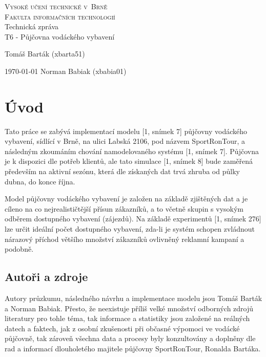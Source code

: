 \documentclass[a4paper, 12pt, hidelinks]{article}
\begin{document}
\begin{titlepage}
	\begin{center}
		\textsc{
			\Huge{Vysoké učení technické v~Brně}\\
			\huge{Fakulta informačních technologií\\}
		}
		\LARGE{
			Technická zpráva\\
			\Huge{T6 - Půjčovna vodáckého vybavení}\\
		}
	\end{center}
	{\Large{
		\hfill
		Tomáš Barták (xbarta51)

        \today
        \hfill
        Norman Babiak (xbabia01)

		}
	}
\end{titlepage}

\rhead{}
\newpage
\tableofcontents
\newpage
\section{Úvod}
Tato práce se zabývá implementací modelu [1, snímek 7] půjčovny vodáckého vybavení, sídlící v Brně, na ulici Labská 2106, pod názvem SportRonTour, a následným zkoumáním chování namodelovaného systému [1, snímek 7]. Půjčovna je k dispozici dle potřeb klientů, ale tato simulace [1, snímek 8] bude zaměřená především na aktivní sezónu, která dle získaných dat trvá zhruba od půlky dubna, do konce října. 

Model půjčovny vodáckého vybavení je založen na základě zjištěných dat a je cíleno na co nejrealističtější přísun zákazníků, a to včetně skupin s vysokým odběrem dostupného vybavení (zájezdů). Na základě experimentů [1, snímek 276] lze určit ideální počet dostupného vybavení, zda-li je systém schopen zvládnout nárazový příchod většího množství zákazníků ovlivněný reklamní kampaní a podobně.

\subsection{Autoři a zdroje}
Autory průzkumu, následného návrhu a implementace modelu jsou Tomáš Barták a Norman Babiak. Přesto, že neexistuje příliš velké množství odborných zdrojů literatury pro tohle téma, tak informace a statistiky jsou založené na reálných datech a faktech, jak z osobní zkušenosti při občasné výpomoci ve vodácké půjčovně, tak zároveň všechna data a procesy byly konzultovány a doplněny dle rad a informací dlouholetého majitele půjčovny SportRonTour, Ronalda Bartáka. 
\end{document}
